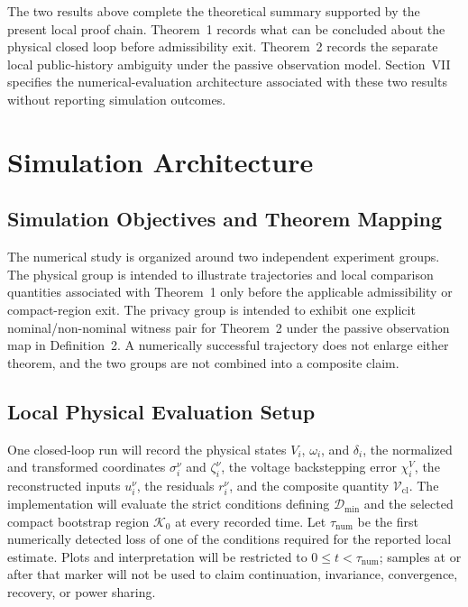 \documentclass[journal]{IEEEtran}
\begin{document}
The two results above complete the theoretical summary supported by the present
local proof chain. Theorem~1 records what can be concluded about the physical
closed loop before admissibility exit. Theorem~2 records the separate local
public-history ambiguity under the passive observation model. Section~VII
specifies the numerical-evaluation architecture associated with these two
results without reporting simulation outcomes.

\section{Simulation Architecture}
\label{sec:simulation_architecture}

\subsection{Simulation Objectives and Theorem Mapping}

The numerical study is organized around two independent experiment groups.
The physical group is intended to illustrate trajectories and local comparison
quantities associated with Theorem~1 only before the applicable admissibility
or compact-region exit. The privacy group is intended to exhibit one explicit
nominal/non-nominal witness pair for Theorem~2 under the passive observation
map in Definition~2. A numerically successful trajectory does not enlarge
either theorem, and the two groups are not combined into a composite claim.

\subsection{Local Physical Evaluation Setup}

One closed-loop run will record the physical states $V_i$, $\omega_i$, and
$\delta_i$, the normalized and transformed coordinates $\sigma_i^\nu$ and
$\zeta_i^\nu$, the voltage backstepping error $\chi_i^V$, the reconstructed
inputs $u_i^\nu$, the residuals $r_i^\nu$, and the composite quantity
$\mathscr V_{\mathrm{cl}}$. The implementation will evaluate the strict
conditions defining $\mathcal D_{\min}$ and the selected compact bootstrap
region $\mathcal K_0$ at every recorded time. Let $\tau_{\mathrm{num}}$ be the
first numerically detected loss of one of the conditions required for the
reported local estimate. Plots and interpretation will be restricted to
$0\leq t<\tau_{\mathrm{num}}$; samples at or after that marker will not be used
to claim continuation, invariance, convergence, recovery, or power sharing.
\end{document}
